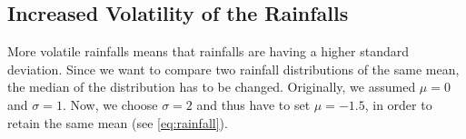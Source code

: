 \documentclass[12pt, a4paper, oneside]{article}
\begin{document}
\subsection{Increased Volatility of the Rainfalls} %
More volatile rainfalls means that rainfalls are having a higher standard deviation.
Since we want to compare two rainfall distributions of the same mean, the median of the distribution has to be changed. 
Originally, we assumed $\mu=0$ and $\sigma=1$. Now, we choose $\sigma=2$ and thus have to set $\mu=-1.5$, in order to retain the same mean (see \ref{eq:rainfall}). %
\end{document}
